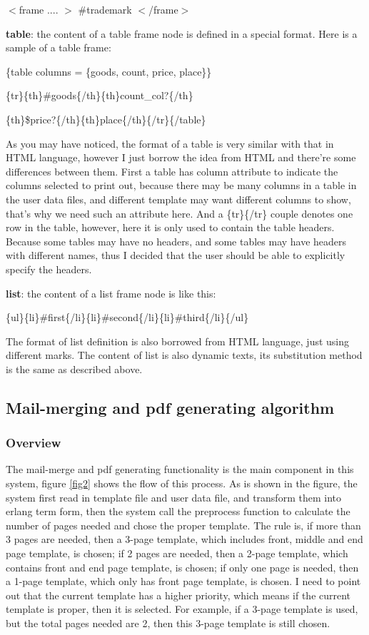 \documentclass[12pt,twoside,a4paper]{report}
\begin{document}
  $<$frame .... $>$ \#trademark $<$/frame$>$

  \textbf{table}: the content of a table frame node is defined in a special format. Here is a sample of a table frame:

\{table columns = \{goods, count, price, place\}\}

\{tr\}\{th\}\#goods\{/th\}\{th\}count\_col?\{/th\}

\{th\}\$price?\{/th\}\{th\}place\{/th\}\{/tr\}\{/table\}

  As you may have noticed, the format of a table is very similar with that in HTML language, however I just borrow the idea from HTML and there're some differences between them. First a table has column attribute to indicate the columns selected to print out, because there may be many columns in a table in the user data files, and different template may want different columns to show, that's why we need such an attribute here. And a \{tr\}\{/tr\} couple denotes one row in the table, however, here it is only used to contain the table headers. Because some tables may have no headers, and some tables may have headers with different names, thus I decided that the user should be able to explicitly specify the headers. 

  \textbf{list}: the content of a list frame node is like this:

\{ul\}\{li\}\#first\{/li\}\{li\}\#second\{/li\}\{li\}\#third\{/li\}\{/ul\}

  The format of list definition is also borrowed from HTML language, just using different marks. The content of list is also dynamic texts, its substitution method is the same as described above. 
  
\subsection{Mail-merging and pdf generating algorithm}
\subsubsection{Overview}

  The mail-merge and pdf generating functionality is the main component in this system, figure \ref{fig2} shows the flow of this process. As is shown in the figure, the system first read in template file and user data file, and transform them into erlang term form, then the system call the preprocess function to calculate the number of pages needed and chose the proper template. The rule is, if more than 3 pages are needed, then a 3-page template, which includes front, middle and end page template, is chosen; if 2 pages are needed, then a 2-page template, which contains front and end page template, is chosen; if only one page is needed, then a 1-page template, which only has front page template, is chosen. I need to point out that the current template has a higher priority, which means if the current template is proper, then it is selected. For example, if a 3-page template is used, but the total pages needed are 2, then this 3-page template is still chosen. 
\end{document}
